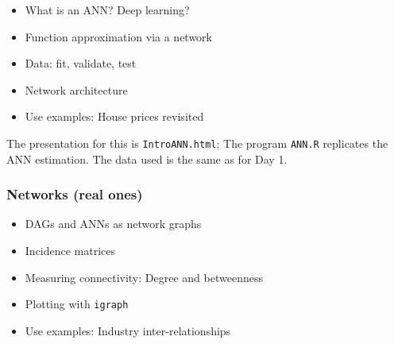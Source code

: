 \documentclass[
  letterpaper,
]{book}
\providecommand{\tightlist}{%
  \setlength{\itemsep}{0pt}\setlength{\parskip}{0pt}}\usepackage{longtable,booktabs,array}
\begin{document}
\begin{itemize}
\tightlist
\item
  What is an ANN? Deep learning?
\item
  Function approximation via a network
\item
  Data: fit, validate, test
\item
  Network architecture
\item
  Use examples: House prices revisited
\end{itemize}

The presentation for this is \texttt{IntroANN.html}; The program
\texttt{ANN.R} replicates the ANN estimation. The data used is the same
as for Day 1.

\hypertarget{networks-real-ones}{%
\subsubsection{Networks (real ones)}\label{networks-real-ones}}

\begin{itemize}
\tightlist
\item
  DAGs and ANNs as network graphs
\item
  Incidence matrices
\item
  Measuring connectivity: Degree and betweenness
\item
  Plotting with \texttt{igraph}
\item
  Use examples: Industry inter-relationships
\end{itemize}
\end{document}
